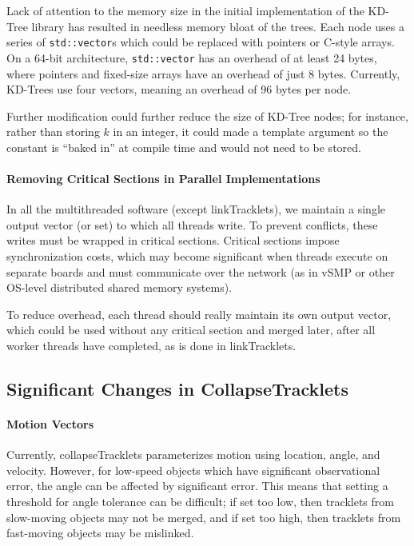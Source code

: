 Lack of attention to the memory size in the initial implementation of
the KD-Tree library has resulted in needless memory bloat of the
trees.  Each node uses a series of \texttt{std::vector}s which could
be replaced with pointers or C-style arrays.  On a 64-bit
architecture, \texttt{std::vector} has an overhead of at least 24
bytes, where pointers and fixed-size arrays have an overhead of just 8
bytes.  Currently, KD-Trees use four vectors, meaning an overhead of
96 bytes per node.

Further modification could further reduce the size of KD-Tree nodes;
for instance, rather than storing $k$ in an integer, it could made a
template argument so the constant is ``baked in'' at compile time and
would not need to be stored.  

\paragraph{Removing Critical Sections in Parallel Implementations}
In all the multithreaded software (except linkTracklets), we maintain
a single output vector (or set) to which all threads write.  To
prevent conflicts, these writes must be wrapped in critical sections.
Critical sections impose synchronization costs, which may become
significant when threads execute on separate boards and must
communicate over the network (as in vSMP or other OS-level distributed
shared memory systems).

To reduce overhead, each thread should really maintain its own output
vector, which could be used without any critical section and merged
later, after all worker threads have completed, as is done in linkTracklets.

\subsection{Significant Changes in CollapseTracklets}

\paragraph{Motion Vectors} 
Currently, collapseTracklets parameterizes motion using location,
angle, and velocity.  However, for low-speed objects which have
significant observational error, the angle can be affected by
significant error.  This means that setting a threshold for angle
tolerance can be difficult; if set too low, then tracklets from
slow-moving objects may not be merged, and if set too high, then
tracklets from fast-moving objects may be mislinked.

